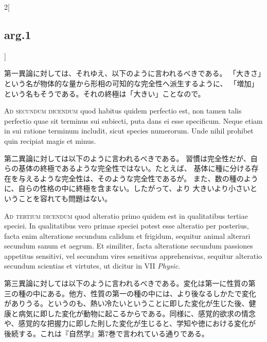 \documentclass[paper=a4paper,fontsize=10pt,jafontsize=9pt,titlepage]{jlreq}
\begin{document}
\begin{paracol}{2}[\subsection{arg.1}]
\switchcolumn

第一異論に対しては、それゆえ、以下のように言われるべきである。
「大きさ」という名が物体的な量から形相の可知的な完全性へ派生するように、
 「増加」という名もそうである。それの終極は「大きい」ことなので。

\switchcolumn*[\subsection{ad.2}]

{\scshape Ad secundum dicendum} quod habitus quidem perfectio est, non tamen
talis perfectio quae sit terminus sui subiecti, puta dans ei esse
specificum. Neque etiam in sui ratione terminum includit, sicut
species numerorum. Unde nihil prohibet quin recipiat magis et minus.

\switchcolumn

第二異論に対しては以下のように言われるべきである。
習慣は完全性だが、自らの基体の終極であるような完全性ではない。たとえば、
 基体に種に分ける存在を与えるような完全性は、そのような完全性であるが。
また、数の種のように、自らの性格の中に終極を含まない。したがって、より
 大きいより小さいということを容れても問題はない。

\switchcolumn*[\subsection{ad.3}]

{\scshape Ad tertium dicendum} quod alteratio primo quidem est in qualitatibus
tertiae speciei. In qualitatibus vero primae speciei potest esse
alteratio per posterius, facta enim alteratione secundum calidum et
frigidum, sequitur animal alterari secundum sanum et aegrum. Et
similiter, facta alteratione secundum passiones appetitus sensitivi,
vel secundum vires sensitivas apprehensivas, sequitur alteratio
secundum scientias et virtutes, ut dicitur in VII {\itshape Physic}.

\switchcolumn

第三異論に対しては以下のように言われるべきである。変化は第一に性質の第
三の種の中にある。他方、性質の第一の種の中には、より後なるしかたで変化
がありうる。というのも、熱い冷たいということに即した変化が生じた後、健
康と病気に即した変化が動物に起こるからである。同様に、感覚的欲求の情念
や、感覚的な把握力に即した則した変化が生じると、学知や徳における変化が
後続する。これは『自然学』第7巻で言われている通りである。

\end{paracol}
\newpage
{}
{}
\setcounter{section}{2}
\setcounter{subsection}{0}
\end{document}
